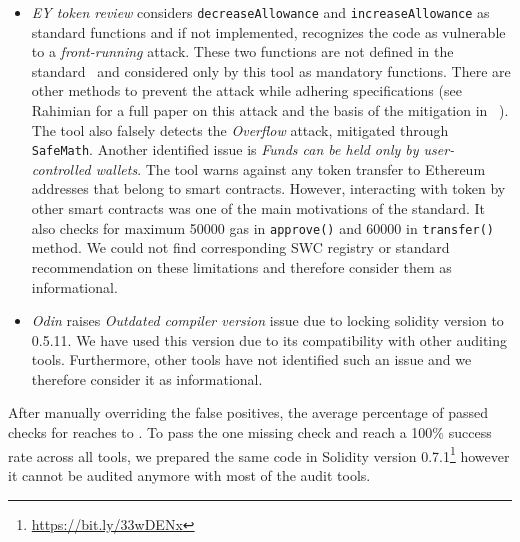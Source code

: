 \begin{itemize}
	\item \textit{EY token review} considers \texttt{decreaseAllowance} and \texttt{increaseAllowance} as standard \erc functions and if not implemented, recognizes the code as vulnerable to a \textit{front-running} attack. These two functions are not defined in the \erc standard~\cite{ERC20Std} and considered only by this tool as mandatory functions. There are other methods to prevent the attack while adhering \erc specifications (see Rahimian \etal for a full paper on this attack and the basis of the mitigation in \sys~\cite{ERC20MWA}). The tool also falsely detects the \textit{Overflow} attack, mitigated through \texttt{SafeMath}. Another identified issue is \textit{Funds can be held only by user-controlled wallets}. The tool warns against any token transfer to Ethereum addresses that belong to smart contracts. However, interacting with \erc token by other smart contracts was one of the main motivations of the \erc standard. It also checks for maximum 50000 gas in \texttt{approve()} and 60000 in \texttt{transfer()} method. We could not find corresponding SWC registry or standard recommendation on these limitations and therefore consider them as informational.

	\item \textit{Odin} raises \textit{Outdated compiler version} issue due to locking solidity version to 0.5.11. We have used this version due to its compatibility with other auditing tools. Furthermore, other tools have not identified such an issue and we therefore consider it as informational.
\end{itemize}

After manually overriding the false positives, the average percentage of passed checks for \sys reaches to \prct. To pass the one missing check and reach a 100\% success rate across all tools, we prepared the same code in Solidity version 0.7.1\footnote{\url{https://bit.ly/33wDENx}} however it cannot be audited anymore with most of the audit tools. 